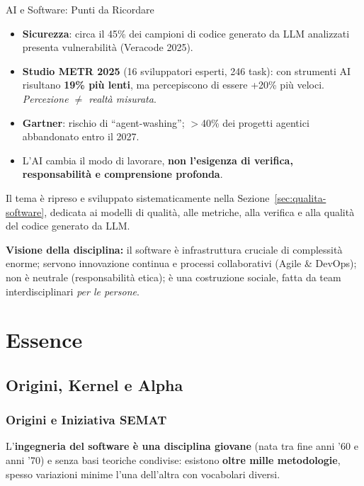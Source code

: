 \documentclass[12pt]{extarticle}
\begin{document}
\begin{cbox}{AI e Software: Punti da Ricordare}
\begin{itemize}
    \item \textbf{Sicurezza}: circa il 45\% dei campioni di codice generato da LLM analizzati presenta vulnerabilità (Veracode 2025).
    \item \textbf{Studio METR 2025} (16 sviluppatori esperti, 246 task): con strumenti AI risultano \textbf{19\% più lenti}, ma percepiscono di essere +20\% più veloci. \textit{Percezione $\neq$ realtà misurata}.
    \item \textbf{Gartner}: rischio di ``agent-washing''; $>$40\% dei progetti agentici abbandonato entro il 2027.
    \item L'AI cambia il modo di lavorare, \textbf{non l'esigenza di verifica, responsabilità e comprensione profonda}.
\end{itemize}
\end{cbox}

\noindent Il tema è ripreso e sviluppato sistematicamente nella Sezione~\ref{sec:qualita-software}, dedicata ai modelli di qualità, alle metriche, alla verifica e alla qualità del codice generato da LLM.

\noindent \textbf{Visione della disciplina:} il software è infrastruttura cruciale di complessità enorme; servono innovazione continua e processi collaborativi (Agile \& DevOps); non è neutrale (responsabilità etica); è una costruzione sociale, fatta da team interdisciplinari \textit{per le persone}.

\newpage

\section{Essence}

\subsection{Origini, Kernel e Alpha}
\subsubsection{Origini e Iniziativa SEMAT}
\noindent L'\textbf{ingegneria del software è una disciplina giovane} (nata tra fine anni '60 e anni '70) e senza basi teoriche condivise: esistono \textbf{oltre mille metodologie}, spesso variazioni minime l'una dell'altra con vocabolari diversi.
\end{document}
